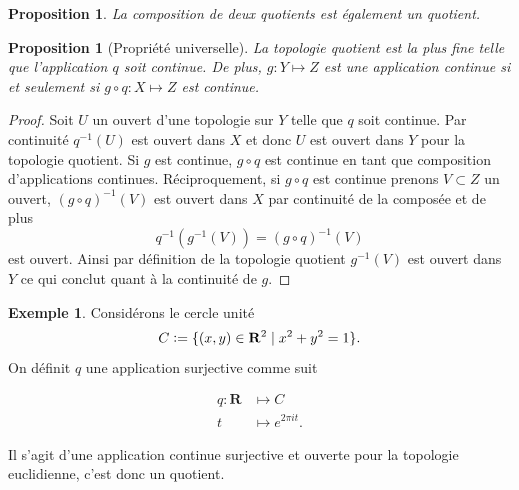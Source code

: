 \documentclass[12pt]{book}
\newcommand{\defeq}{\vcentcolon=}
\newtheorem{prop}[lemma]{Proposition}
\theoremstyle{definition}
\newtheorem{example}[lemma]{Exemple}
\theoremstyle{remark}
\begin{document}
	\begin{prop}
		La composition de deux quotients est également un quotient.
	\end{prop}
	\begin{prop}[Propriété universelle]
		La topologie quotient est la plus fine telle que l'application $q$ soit continue. De plus, $g : Y \longmapsto Z$ est une application continue si et seulement si $g \circ q : X \longmapsto Z$ est continue.
	\end{prop}
	\begin{proof}
		Soit $U$ un ouvert d'une topologie sur $Y$ telle que $q$ soit continue. Par continuité $q^{-1}(U)$ est ouvert dans $X$ et donc $U$ est ouvert dans $Y$ pour la topologie quotient. 
	Si $g$ est continue, $g\circ q$ est continue en tant que composition d'applications continues. Réciproquement, si  $g \circ q$ est continue prenons $V \subset Z$ un ouvert, ${(g\circ q)}^{-1}(V)$ est ouvert dans $X$ par continuité de la composée et de plus \[
			q^{-1}(g^{-1}(V)) = (g\circ q)^{-1}(V)
		\] est ouvert. Ainsi par définition de la topologie quotient $g^{-1}(V)$ est ouvert dans $Y$ ce qui conclut quant à la continuité de $g$. 
	\end{proof}
	\begin{example}
		Considérons le cercle unité \[
			C \defeq \{(x,y) \in \mathbf{R}^2 \;|\; x^2 + y^2 = 1\} 
		.\] 
		On définit $q$ une application surjective comme suit \\ 
		\begin{minipage}{0.5\textwidth}
			\begin{align*}
				q : \mathbf{R} &\longmapsto C\\
				t&\longmapsto e^{2\pi it}
			.\end{align*}	
		\end{minipage}
		\hfill
		\begin{minipage}{0.5\textwidth}
			\centering
		\end{minipage}
		\bigskip

		Il s'agit d'une application continue surjective et ouverte pour la topologie euclidienne, c'est donc un quotient.
	\end{example}
	
\end{document}
